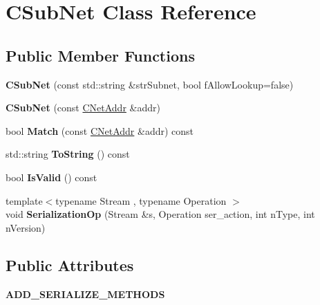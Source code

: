 \hypertarget{class_c_sub_net}{}\section{C\+Sub\+Net Class Reference}
\label{class_c_sub_net}
\subsection*{Public Member Functions}
\begin{DoxyCompactItemize}
\item 
\mbox{\label{class_c_sub_net_a6e8cd7a5e46e93d3ad62896dcb5a5a78}} 
{\bfseries C\+Sub\+Net} (const std\+::string \&str\+Subnet, bool f\+Allow\+Lookup=false)
\item 
\mbox{\label{class_c_sub_net_ad322a9932df6077de7c4c7b6721fa22f}} 
{\bfseries C\+Sub\+Net} (const \mbox{\hyperlink{class_c_net_addr}{C\+Net\+Addr}} \&addr)
\item 
\mbox{\label{class_c_sub_net_af84fa02ebca222739c55e9d2cd7d38a3}} 
bool {\bfseries Match} (const \mbox{\hyperlink{class_c_net_addr}{C\+Net\+Addr}} \&addr) const
\item 
\mbox{\label{class_c_sub_net_a91cabfec6c5056fe8f8b477334563880}} 
std\+::string {\bfseries To\+String} () const
\item 
\mbox{\label{class_c_sub_net_abe05f70043af710ac075a4dd77757394}} 
bool {\bfseries Is\+Valid} () const
\item 
\mbox{\label{class_c_sub_net_a98e9dba67027fadc6055f4a2d4911c8c}} 
{\footnotesize template$<$typename Stream , typename Operation $>$ }\\void {\bfseries Serialization\+Op} (Stream \&s, Operation ser\+\_\+action, int n\+Type, int n\+Version)
\end{DoxyCompactItemize}
\subsection*{Public Attributes}
\begin{DoxyCompactItemize}
\item 
\mbox{\label{class_c_sub_net_a1eeee6eebf7df4cb52de4dbed45e21cd}} 
{\bfseries A\+D\+D\+\_\+\+S\+E\+R\+I\+A\+L\+I\+Z\+E\+\_\+\+M\+E\+T\+H\+O\+DS}
\end{DoxyCompactItemize}
